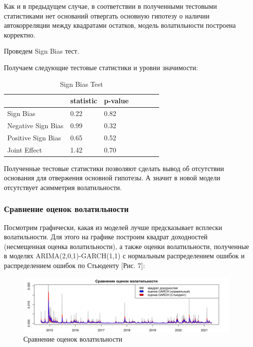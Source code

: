 \documentclass[a4paper,12pt,twoside]{article}
\begin{document}
Как и в предыдущем случае, в соответствии в полученными тестовыми статистиками нет оснований отвергать основную гипотезу о наличии автокорреляции между квадратами остатков, модель волатильности построена корректно.

Проведем Sign Bias тест.

Получаем следующие тестовые статистики и уровни значимости:

\begin{table}[!h]
\centering
\begin{tabular}{lllllll}
  \hline
          &  statistic  &  p-value  \\
  \hline
  Sign Bias   & 0.22 & 0.82 \\
  Negative Sign Bias  & 0.99 &  0.32 \\
  Positive Sign Bias  & 0.65 &  0.52 \\
  Joint Effect   & 1.42 &  0.70 \\
  \hline
\end{tabular}
\caption{Sign Bias Test}
\end{table}

Полученные тестовые статистики позволяют сделать вывод об отсутствии основания для отвержения основной гипотезы.
А значит в новой модели отсутствует асимметрия волатильности.

\subsubsection{Сравнение оценок волатильности}

Посмотрим графически, какая из моделей лучше предсказывает всплески волатильности. Для этого на графике построим квадрат доходностей (несмещенная оценка волатильности), а также оценки волатильности, полученные в моделях ARIMA(2,0,1)-GARCH(1,1) с нормальным распределением ошибок и распределением ошибок по Стьюденту [Рис. 7]:

\begin{figure}[!h]
    \includegraphics[scale = 0.46]{mvideo_8.png}
    \caption{Сравнение оценок волатильности}
    \label{fig:mvideo_08}
\end{figure}
\end{document}
